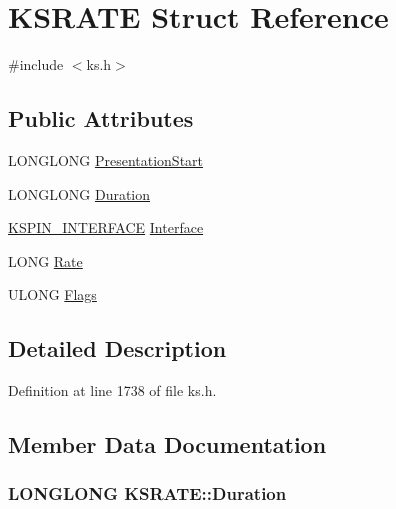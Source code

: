 \hypertarget{struct_k_s_r_a_t_e}{}\section{K\+S\+R\+A\+TE Struct Reference}
\label{struct_k_s_r_a_t_e}


{\ttfamily \#include $<$ks.\+h$>$}

\subsection*{Public Attributes}
\begin{DoxyCompactItemize}
\item 
L\+O\+N\+G\+L\+O\+NG \hyperlink{struct_k_s_r_a_t_e_a673440bbf1666ffc11037efa7eb1a5c4}{Presentation\+Start}
\item 
L\+O\+N\+G\+L\+O\+NG \hyperlink{struct_k_s_r_a_t_e_a0859d9ed92e8f760e1dcb4fab5d78cb9}{Duration}
\item 
\hyperlink{ks_8h_adc19b00535ad29d2d9baddb0a0c36f9d}{K\+S\+P\+I\+N\+\_\+\+I\+N\+T\+E\+R\+F\+A\+CE} \hyperlink{struct_k_s_r_a_t_e_a655776cb0b496e7250a982dd3b96d373}{Interface}
\item 
L\+O\+NG \hyperlink{struct_k_s_r_a_t_e_a0a82bb725433fcbe5576284e060dc565}{Rate}
\item 
U\+L\+O\+NG \hyperlink{struct_k_s_r_a_t_e_a923895bbb2239bc347876c9c8757b951}{Flags}
\end{DoxyCompactItemize}


\subsection{Detailed Description}


Definition at line 1738 of file ks.\+h.



\subsection{Member Data Documentation}
\subsubsection[{\texorpdfstring{Duration}{Duration}}]{\setlength{\rightskip}{0pt plus 5cm}L\+O\+N\+G\+L\+O\+NG K\+S\+R\+A\+T\+E\+::\+Duration}\hypertarget{struct_k_s_r_a_t_e_a0859d9ed92e8f760e1dcb4fab5d78cb9}{}\label{struct_k_s_r_a_t_e_a0859d9ed92e8f760e1dcb4fab5d78cb9}


